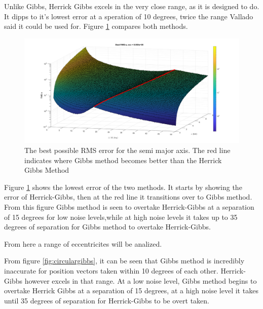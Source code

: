 \documentclass[12pt]{article}
\begin{document}
	Unlike Gibbs, Herrick Gibbs excels in the very close range, as it is designed to do. It dipps to it's lowest error at a speration of 10 degrees, twice the range Vallado  \cite{vallado2007fundamentals} said it could be used for. Figure \ref{fig:bestmethodscirc} compares both methods.

\begin{figure}
	\centering
	\includegraphics[width=0.7\linewidth]{bestMethodsCirc}
	\caption{The best possible RMS error for the semi major axis. The red line indicates where Gibbs method becomes better than the Herrick Gibbs Method}
	\label{fig:bestmethodscirc}
\end{figure}
	Figure \ref{fig:bestmethodscirc} shows the lowest error of the two methods. It starts by showing the error of Herrick-Gibbs, then at the red line it transitions over to Gibbs method. From this figure Gibbs method is seen to overtake Herrick-Gibbs at a separation of 15 degrees for low noise levels,while at high noise levels it takes up to 35 degrees of separation for Gibbs method to overtake Herrick-Gibbs.\par 
	
	
	
	From here a range of eccentricites will be analized. 

	From figure \ref{fig:circulargibbs}, it can be seen that Gibbs method is incredibly inaccurate for position vectors taken within 10 degrees of each other. Herrick-Gibbs however excels in that range. At a low noise level, Gibbs method begins to overtake Herrick Gibbs at a separation of 15 degrees, at a high noise level it takes until 35 degrees of separation for Herrick-Gibbs to be overt taken.
	
	\iffalse
	
\end{document}
